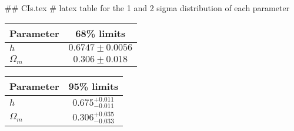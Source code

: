 ## CIs.tex
# latex table for the 1 and 2 sigma distribution of each parameter

\begin{tabular} { l  c}
 Parameter &  68\% limits\\
\hline
{\boldmath$h              $} & $0.6747\pm 0.0056          $\\
{\boldmath$\Omega_m       $} & $0.306\pm 0.018            $\\
\hline
\end{tabular}

\begin{tabular} { l  c}
 Parameter &  95\% limits\\
\hline
{\boldmath$h              $} & $0.675^{+0.011}_{-0.011}   $\\
{\boldmath$\Omega_m       $} & $0.306^{+0.035}_{-0.033}   $\\
\hline
\end{tabular}
